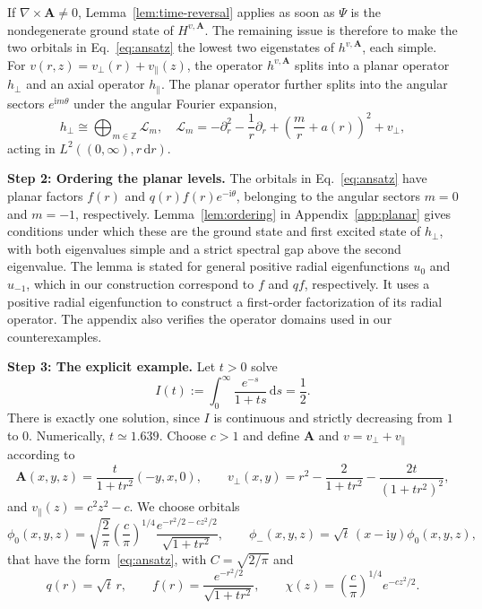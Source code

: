 \documentclass[11pt,a4paper]{article}
\theoremstyle{remark}
\theoremstyle{plain}
\newcommand{\A}{\mathbf A}
\begin{document}
If $\nabla\times\A\ne0$, Lemma~\ref{lem:time-reversal} applies as soon
as $\Psi$ is the nondegenerate ground state of $H^{v,\A}$.
The remaining issue is therefore to make the two orbitals
in Eq.~\eqref{eq:ansatz} the lowest two eigenstates of $h^{v,\A}$,
each simple.
For $v(r,z)=v_\perp(r)+v_\parallel(z)$, the operator $h^{v,\A}$
splits into a planar operator $h_\perp$ and an axial operator
$h_\parallel$. The planar operator further splits into the angular
sectors $e^{\mathrm{i}m\theta}$ under the angular Fourier expansion,
\begin{equation}\label{eq:Lm}
 h_\perp\cong\bigoplus_{m\in\mathbb Z}\mathcal L_m,
 \quad 
 \mathcal L_m=-\partial_r^2-\frac1r\partial_r
       +\left(\frac mr+a(r)\right)^2+v_\perp,
\end{equation}
acting in $L^2((0,\infty),r\,\mathrm{d}r)$.

\noindent\textbf{Step 2: Ordering the planar levels.}
The orbitals in Eq.~\eqref{eq:ansatz} have planar factors
$f(r)$ and $q(r)f(r)e^{-\mathrm{i}\theta}$, belonging to the
angular sectors $m=0$ and $m=-1$, respectively.
Lemma~\ref{lem:ordering} in Appendix~\ref{app:planar} gives conditions under which these are
the ground state and first excited state of $h_\perp$,
with both eigenvalues simple and a strict spectral gap
above the second eigenvalue.
The lemma is stated for general positive radial eigenfunctions
$u_0$ and $u_{-1}$, which in our construction correspond to
$f$ and $qf$, respectively.
It uses a positive radial eigenfunction to construct a first-order
factorization of its radial operator. The appendix also
verifies the operator domains used in our counterexamples.

\noindent\textbf{Step 3: The explicit example.}
Let $t>0$ solve
\begin{equation*}
 I(t):=\int_0^\infty\frac{e^{-s}}{1+ts}\,\mathrm{d}s=\frac12.
\end{equation*}
There is exactly one solution, since $I$ is continuous and strictly
decreasing from $1$ to $0$. Numerically,
$t\simeq1.639$. Choose $c>1$ and define 
$\A$ and $v = v_\perp + v_\parallel$ according to 
\begin{equation}
 \A(x,y,z)=\frac{t}{1+tr^2}(-y,x,0),\qquad
 v_\perp(x,y)=r^2-\frac{2}{1+tr^2}-\frac{2t}{(1+tr^2)^2},
 \label{eq:explicit-A}
\end{equation}
and $v_\parallel(z) = c^2z^2-c$. 
We choose orbitals
\begin{equation}
 \phi_0(x,y,z)=\sqrt{\frac2\pi}\left(\frac c\pi\right)^{1/4}
 \frac{e^{-r^2/2-cz^2/2}}{\sqrt{1+tr^2}},\qquad
 \phi_-(x,y,z)=\sqrt t\,(x-\mathrm{i}y)\phi_0(x,y,z),
 \label{eq:explicit-orbitals}
\end{equation}
that have the form~\eqref{eq:ansatz}, with
$C=\sqrt{2/\pi}$ and
\begin{equation*}
 q(r)=\sqrt t\,r,\qquad f(r)=\frac{e^{-r^2/2}}{\sqrt{1+tr^2}},\qquad
 \chi(z)=\left(\frac c\pi\right)^{1/4}e^{-cz^2/2}.
\end{equation*}
\end{document}
